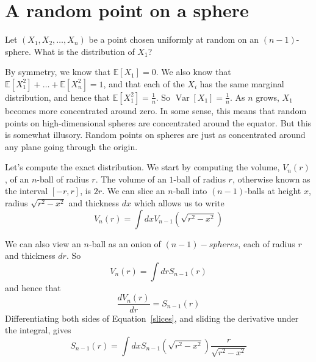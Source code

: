 \documentclass{article}
\newcommand\bbe{\mathbb{E}}
\newcommand\var{\mathop{\mathrm{Var}}}
\begin{document}
\section{A random point on a sphere}
Let $(X_1,X_2,\ldots,X_n)$ be a point chosen uniformly at random on an $(n-1)$-sphere.
What is the distribution of $X_1$?

By symmetry, we know that $\bbe[X_1]=0$.
We also know that $\bbe[X_1^2]+\ldots+\bbe[X_n^2]=1$, and that each of the $X_i$ has the same marginal distribution, and hence that $\bbe[X_1^2]=\frac{1}{n}$.
So $\var[X_1]=\frac{1}{n}$.
As $n$ grows, $X_1$ becomes more concentrated around zero.
In some sense, this means that random points on high-dimensional spheres are concentrated around the equator.
But this is somewhat illusory.
Random points on spheres are just as concentrated around any plane going through the origin.

Let's compute the exact distribution.
We start by computing the volume, $V_n(r)$, of an $n$-ball of radius $r$.
The volume of an $1$-ball of radius $r$, otherwise known as the interval $[-r, r]$, is $2r$.
We can slice an $n$-ball into $(n-1)$-balls at height $x$, radius $\sqrt{r^2-x^2}$ and thickness $dx$ which allows us to write
\begin{equation}
V_n(r) = \int dx V_{n-1}(\sqrt{r^2-x^2})
\label{slices}
\end{equation}

We can also view an $n$-ball as an onion of $(n-1)-spheres$, each of radius $r$ and thickness $dr$.
So
\[
V_n(r) = \int dr S_{n-1}(r)
\]
and hence that
\[
\frac{dV_n(r)}{dr} = S_{n-1}(r)
\]
Differentiating both sides of Equation~\ref{slices}, and sliding the derivative under the integral, gives
\[
S_{n-1}(r) = \int dx S_{n-1}(\sqrt{r^2-x^2})\frac{r}{\sqrt{r^2-x^2}}
\]
\end{document}
